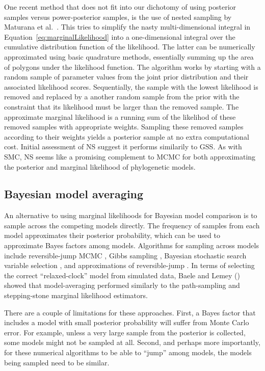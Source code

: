 One recent method that does not fit into our dichotomy of using
posterior samples versus power-posterior samples, is the
use of nested sampling by Maturana et al.\ \citeyear{Maturana2017}.
This tries to simplify the nasty multi-dimensional integral in
Equation~\ref{eq:marginalLikelihood}
into a one-dimensional integral over the cumulative distribution function
of the likelihood.
The latter can be numerically approximated using basic quadrature methods,
essentially summing up the area of polygons under the likelihood function.
The algorithm works by starting with a random sample of parameter values
from the joint prior distribution and their associated likelihood
scores.
Sequentially, the sample with the lowest likelihood is removed and replaced by
a another random sample from the prior with the constraint that its likelihood
must be larger than the removed sample.
The approximate marginal likelihood is a running sum of the likelihod of these
removed samples with appropriate weights.
Sampling these removed samples according to their weights yields a posterior
sample at no extra computational cost.
Initial assessment of NS suggest it performs similarily to GSS.
As with SMC, NS seems like a promising complement to MCMC for both
approximating the posterior and marginal likelihood of phylogenetic models.


\subsection{Bayesian model averaging}

An alternative to using marginal likelihoods for Bayesian model comparison is
to sample across the competing models directly.
The frequency of samples from each model approximates their posterior
probability, which can be used to approximate Bayes factors among models.
Algorithms for sampling across models include reversible-jump MCMC
\citep{Green1995}, Gibbs sampling \citep{Neal2000}, Bayesian stochastic search
variable selection \citep{George1993,Kuo1998}, and approximations of reversible-jump
\citep{Jones2015}.
In terms of selecting the correct ``relaxed-clock'' model from simulated data,
Baele and Lemey (\citeyear{Baele2014}) showed that model-averaging performed
similarly to the path-sampling and stepping-stone marginal likelihood
estimators.

There are a couple of limitations for these approaches.
First, a Bayes factor that includes a model with small posterior probability
will suffer from Monte Carlo error.
For example, unless a very large sample from the posterior is collected, some
models might not be sampled at all.
Second, and perhaps more importantly, for these numerical algorithms to be able
to ``jump'' among models, the models being sampled need to be similar.

